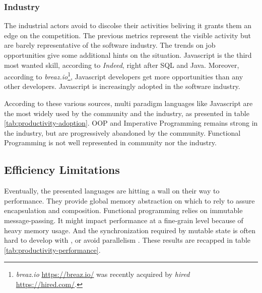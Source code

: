 \subsubsection{Industry}

The industrial actors avoid to discolse their activities beliving it grants them an edge on the competition.
The previous metrics represent the visible activity but are barely representative of the software industry.
The trends on job opportunities give some additional hints on the situation.
Javascript is the third most wanted skill, according to \textit{Indeed}, right after SQL and Java.
Moreover, according to \textit{breaz.io}\footnote{\textit{breaz.io} \url{https://breaz.io/} was recently acquired by \textit{hired} \url{https://hired.com/}.}, Javascript developers get more opportunities than any other developers.
Javascript is increasingly adopted in the software industry.

\separator

According to these various sources, multi paradigm languages like Javascript are the most widely used by the community and the industry, as presented in table \ref{tab:productivity-adoption}.
OOP and Imperative Programming remains strong in the industry, but are progressively abandoned by the community.
Functional Programming is not well represented in community nor the industry.



\subsection{Efficiency Limitations} \label{chapter3:software-productivity:efficiency-limitations}

Eventually, the presented languages are hitting a wall on their way to performance.
They provide global memory abstraction on which to rely to assure encapsulation and composition. %
Functional programming relies on immutable message-passing.
It might impact performance at a fine-grain level because of heavy memory usage.
And the synchronization required by mutable state is often hard to develop with \cite{Adya2002}, or avoid parallelism \cite{Pai1999,Krohn2007}.
These results are recapped in table \ref{tab:productivity-performance}.

